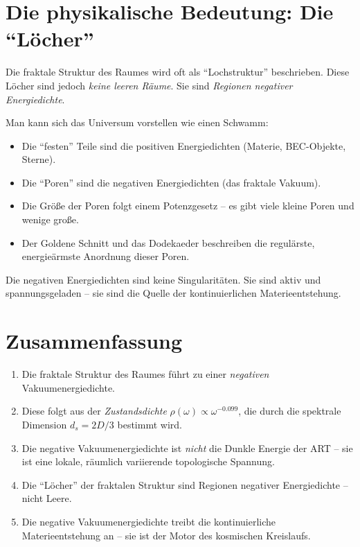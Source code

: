 \section{Die physikalische Bedeutung: Die \enquote{Löcher}}

Die fraktale Struktur des Raumes wird oft als \enquote{Lochstruktur} beschrieben. Diese Löcher sind jedoch \emph{keine leeren Räume}. Sie sind \emph{Regionen negativer Energiedichte}.

Man kann sich das Universum vorstellen wie einen Schwamm:

\begin{itemize}
    \item Die \enquote{festen} Teile sind die positiven Energiedichten (Materie, BEC-Objekte, Sterne).
    \item Die \enquote{Poren} sind die negativen Energiedichten (das fraktale Vakuum).
    \item Die Größe der Poren folgt einem Potenzgesetz – es gibt viele kleine Poren und wenige große.
    \item Der Goldene Schnitt und das Dodekaeder beschreiben die regulärste, energieärmste Anordnung dieser Poren.
\end{itemize}

Die negativen Energiedichten sind keine Singularitäten. Sie sind aktiv und spannungsgeladen – sie sind die Quelle der kontinuierlichen Materieentstehung.

\section{Zusammenfassung}

\begin{enumerate}
    \item Die fraktale Struktur des Raumes führt zu einer \emph{negativen} Vakuumenergiedichte.
    \item Diese folgt aus der \emph{Zustandsdichte} \(\rho(\omega) \propto \omega^{-0.099}\), die durch die spektrale Dimension \(d_s = 2D/3\) bestimmt wird.
    \item Die negative Vakuumenergiedichte ist \emph{nicht} die Dunkle Energie der ART – sie ist eine lokale, räumlich variierende topologische Spannung.
    \item Die \enquote{Löcher} der fraktalen Struktur sind Regionen negativer Energiedichte – nicht Leere.
    \item Die negative Vakuumenergiedichte treibt die kontinuierliche Materieentstehung an – sie ist der Motor des kosmischen Kreislaufs.
\end{enumerate}
